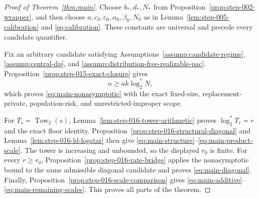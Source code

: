 \begin{proof}[Proof of Theorem~\ref{thm:main}]
Choose $b_*,d_*,N_*$ from
Proposition~\ref{prop:step-002-wrapper}, and then choose
$a,c_\delta,\varepsilon_0,\alpha_0,\beta_0,N_0$ as in
Lemma~\ref{lem:step-005-calibration} and \eqref{eq:calibration}.  These
constants are universal and precede every candidate quantifier.

Fix an arbitrary candidate satisfying
Assumptions~\ref{assump:candidate-regime},
\ref{assump:central-dp}, and
\ref{assump:distribution-free-realizable-pac}.  Proposition~\ref{prop:step-015-exact-closure}
gives
\[
n\ge ak\log_2^*N,
\]
which proves \eqref{eq:main-nonasymptotic} with the exact fixed-size,
replacement-private, population-risk, and unrestricted-improper scope.

For $T_s=\operatorname{Tow}_2(s)$, Lemma~\ref{lem:step-016-tower-arithmetic}
proves $\log_2^*T_r=r$ and the exact floor identity.
Proposition~\ref{prop:step-016-structural-diagonal} and
Lemma~\ref{lem:step-016-ld-logstar} then give
\eqref{eq:main-structure}--\eqref{eq:main-product-scale}.  The tower is
increasing and unbounded, so the displayed $r_0$ is finite.  For every
$r\ge r_0$, Proposition~\ref{prop:step-016-rate-bridge} applies the
nonasymptotic bound to the same admissible diagonal candidate and proves
\eqref{eq:main-diagonal}.  Finally,
Proposition~\ref{prop:step-016-scale-comparison} gives
\eqref{eq:main-additive}--\eqref{eq:main-remaining-scales}.  This proves all
parts of the theorem.
\end{proof}
